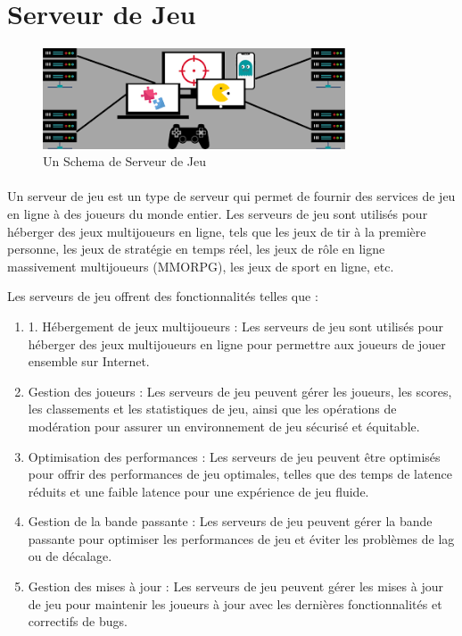\section{Serveur de Jeu}
	\begin{figure}[h]
		\begin{center}
		 
	
\includegraphics[width=0.8\textwidth]{PhotoMemoire/serveur_jeux.png}
\caption{Un Schema de Serveur de Jeu}
	\end{center}
	\end{figure}
		
\paragraph{ }
Un serveur de jeu est un type de serveur qui permet de fournir des services de jeu en ligne à des joueurs du monde entier. Les serveurs de jeu sont utilisés pour héberger des jeux multijoueurs en ligne, tels que les jeux de tir à la première personne, les jeux de stratégie en temps réel, les jeux de rôle en ligne massivement multijoueurs (MMORPG), les jeux de sport en ligne, etc.

Les serveurs de jeu offrent des fonctionnalités telles que :
\begin{enumerate}
	
  \item 1. Hébergement de jeux multijoueurs : Les serveurs de jeu sont utilisés pour héberger des jeux multijoueurs en ligne pour permettre aux joueurs de jouer ensemble sur Internet.
 
 \item  Gestion des joueurs : Les serveurs de jeu peuvent gérer les joueurs, les scores, les classements et les statistiques de jeu, ainsi que les opérations de modération pour assurer un environnement de jeu sécurisé et équitable.
 
 \item  Optimisation des performances : Les serveurs de jeu peuvent être optimisés pour offrir des performances de jeu optimales, telles que des temps de latence réduits et une faible latence pour une expérience de jeu fluide.
 
\item    Gestion de la bande passante : Les serveurs de jeu peuvent gérer la bande passante pour optimiser les performances de jeu et éviter les problèmes de lag ou de décalage.
 
 \item  Gestion des mises à jour : Les serveurs de jeu peuvent gérer les mises à jour de jeu pour maintenir les joueurs à jour avec les dernières fonctionnalités et correctifs de bugs.
 
\end{enumerate}

